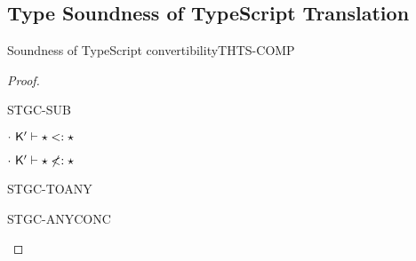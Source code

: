 \documentclass[acmlarge, anonymous, authordraft]{acmart}
\begin{document}
\subsection{Type Soundness of TypeScript Translation}
\begin{lemma}{Soundness of TypeScript convertibility}{THTS-COMP}
  \begin{conds}
    \cond{$\EnvTypeS\Env\K\e\t$}
    \cond{$\ep = \TRG{\e}\Env$}
    \cond{$\TR\K = \Kp$}
    \cond{$\TR\Env = \Envp$}
    \cond{$\EnvType\Envp\cdot\Kp{\ep}{\any}$}
  \end{conds}
  \then\axiom{$\EnvType\Envp\cdot\Kp{\TAG\e\Env{\any}}{\any}$}

  \begin{proof}{ }

  \begin{case}{STGC-SUB}
    \begin{case}{$\cdot~{{\sf{K'}}}\vdash \star<: \star$}
    \end{case}

    \begin{case}{$\cdot~{{\sf{K'}}}\vdash \star \not<: \star$}
    \end{case}
  \end{case}

  \begin{case}{STGC-TOANY}
  \end{case}

  \begin{case}{STGC-ANYCONC}
  \end{case}

  \end{proof}
\end{lemma}
\end{document}
